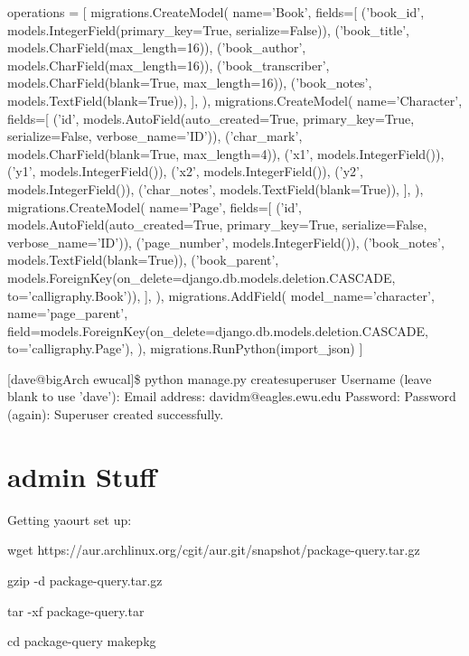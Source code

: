     operations = [
        migrations.CreateModel(
            name='Book',
            fields=[
                ('book_id', models.IntegerField(primary_key=True, serialize=False)),
                ('book_title', models.CharField(max_length=16)),
                ('book_author', models.CharField(max_length=16)),
                ('book_transcriber', models.CharField(blank=True, max_length=16)),
                ('book_notes', models.TextField(blank=True)),
            ],
        ),
        migrations.CreateModel(
            name='Character',
            fields=[
                ('id', models.AutoField(auto_created=True, primary_key=True, serialize=False, verbose_name='ID')),
                ('char_mark', models.CharField(blank=True, max_length=4)),
                ('x1', models.IntegerField()),
                ('y1', models.IntegerField()),
                ('x2', models.IntegerField()),
                ('y2', models.IntegerField()),
                ('char_notes', models.TextField(blank=True)),
            ],
        ),
        migrations.CreateModel(
            name='Page',
            fields=[
                ('id', models.AutoField(auto_created=True, primary_key=True, serialize=False, verbose_name='ID')),
                ('page_number', models.IntegerField()),
                ('book_notes', models.TextField(blank=True)),
                ('book_parent', models.ForeignKey(on_delete=django.db.models.deletion.CASCADE, to='calligraphy.Book')),
            ],
        ),
        migrations.AddField(
            model_name='character',
            name='page_parent',
            field=models.ForeignKey(on_delete=django.db.models.deletion.CASCADE, to='calligraphy.Page'),
        ),
        migrations.RunPython(import_json)
    ]
    
    
    
    [dave@bigArch ewucal]\$ python manage.py createsuperuser
Username (leave blank to use 'dave'): 
Email address: davidm@eagles.ewu.edu
Password: 
Password (again): 
Superuser created successfully.






\section{admin Stuff}


Getting yaourt set up:



wget https://aur.archlinux.org/cgit/aur.git/snapshot/package-query.tar.gz

gzip -d package-query.tar.gz

tar -xf package-query.tar

cd package-query
makepkg

